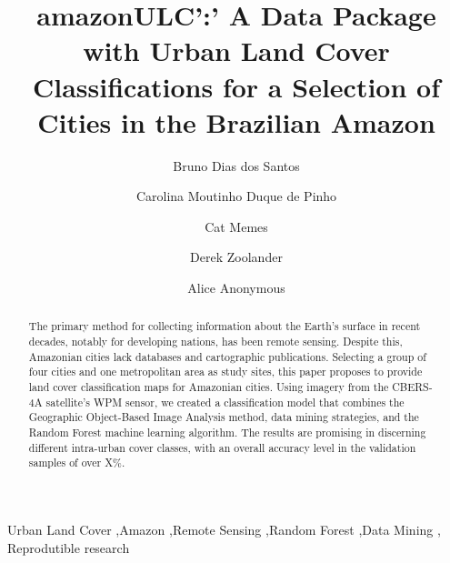 \documentclass[preprint, 3p,
authoryear]{elsarticle} %
\begin{document}
\begin{frontmatter}

  \title{amazonULC':' A Data Package with Urban Land Cover
Classifications for a Selection of Cities in the Brazilian Amazon}
    \author[National Institute for Space Research (INPE)]{Bruno Dias dos
Santos%
  }
    \author[Federal University of ABC (UFABC)]{Carolina Moutinho Duque
de Pinho%
  }
    \author[Another University]{Cat Memes%
  }
    \author[Some Institute of Technology]{Derek Zoolander%
  }
    \author[Some Institute of Technology]{Alice Anonymous%
  }
  
  \begin{abstract}
  The primary method for collecting information about the Earth's
  surface in recent decades, notably for developing nations, has been
  remote sensing. Despite this, Amazonian cities lack databases and
  cartographic publications. Selecting a group of four cities and one
  metropolitan area as study sites, this paper proposes to provide land
  cover classification maps for Amazonian cities. Using imagery from the
  CBERS-4A satellite's WPM sensor, we created a classification model
  that combines the Geographic Object-Based Image Analysis method, data
  mining strategies, and the Random Forest machine learning algorithm.
  The results are promising in discerning different intra-urban cover
  classes, with an overall accuracy level in the validation samples of
  over X\%.
  \end{abstract}
    \begin{keyword}
    Urban Land Cover \sep Amazon \sep Remote Sensing \sep Random
Forest \sep Data Mining \sep 
    Reprodutible research
  \end{keyword}
  
 \end{frontmatter}
\end{document}
